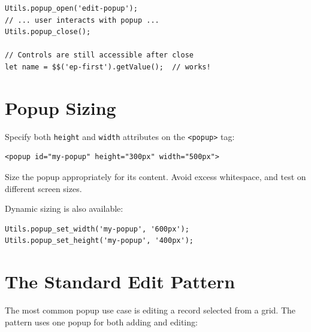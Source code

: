 \begin{lstlisting}[style=javascript]
Utils.popup_open('edit-popup');
// ... user interacts with popup ...
Utils.popup_close();

// Controls are still accessible after close
let name = $$('ep-first').getValue();  // works!
\end{lstlisting}

\section{Popup Sizing}
\label{sec:popup-sizing}

Specify both \texttt{height} and \texttt{width} attributes on the \texttt{<popup>} tag:

\begin{lstlisting}[style=html]
<popup id="my-popup" height="300px" width="500px">
\end{lstlisting}

\noindent
Size the popup appropriately for its content.  Avoid excess whitespace, and test on different screen sizes.

Dynamic sizing is also available:

\begin{lstlisting}[style=javascript]
Utils.popup_set_width('my-popup', '600px');
Utils.popup_set_height('my-popup', '400px');
\end{lstlisting}

\section{The Standard Edit Pattern}
\label{sec:popup-edit-pattern}

The most common popup use case is editing a record selected from a grid.  The pattern uses one popup for both adding and editing:

